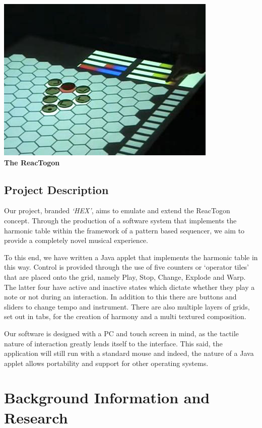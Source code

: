 \documentclass[10pt,a4paper]{article}
\begin{document}
\begin{center}
\includegraphics[scale=0.35]{1.jpg}\\
\textbf{The ReacTogon}
\end{center}

\subsection{Project Description}
Our project, branded \textit{`HEX’}, aims to emulate and extend the ReacTogon concept. Through the production of a software system that implements the harmonic table within the framework of a pattern based sequencer, we aim to provide a completely novel musical experience.

To this end, we have written a Java applet that implements the harmonic table in this way. Control is provided through the use of five counters or `operator tiles’ that are placed onto the grid, namely Play, Stop, Change, Explode and Warp. The latter four have active and inactive states which dictate whether they play a note or not during an interaction. In addition to this there are buttons and sliders to change tempo and instrument. There are also multiple layers of grids, set out in tabs, for the creation of harmony and a multi textured composition.

Our software is designed with a PC and touch screen in mind, as the tactile nature of interaction greatly lends itself to the interface. This said, the application will still run with a standard mouse and indeed, the nature of a Java applet allows portability and support for other operating systems.

\section{Background Information and Research}
\end{document}
